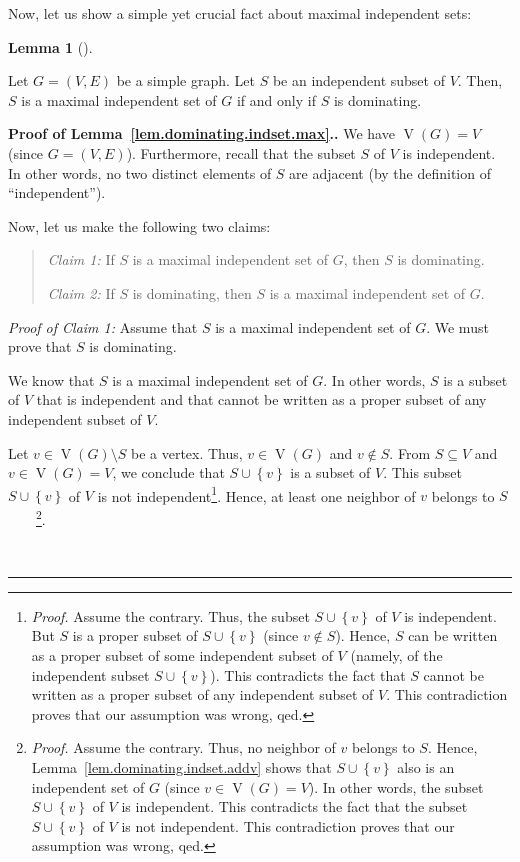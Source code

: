 \documentclass[numbers=enddot,12pt,final,onecolumn,notitlepage]{scrartcl}%
\theoremstyle{definition}
\newtheorem{lem}[theo]{Lemma}
\newenvironment{lemma}[1][]
{\begin{lem}[#1]\begin{leftbar}}
{\end{leftbar}\end{lem}}
\newenvironment{statement}{\begin{quote}}{\end{quote}}
\newenvironment{proof}[1][Proof]{\noindent\textbf{#1.} }{\ \rule{0.5em}{0.5em}}
\newcommand{\set}[1]{\left\{ #1 \right\}}
\newcommand{\tup}[1]{\left( #1 \right)}
\newcommand{\verts}[1]{\operatorname{V}\left( #1 \right)}
\begin{document}
Now, let us show a simple yet crucial fact about maximal independent
sets:

\begin{lemma} \label{lem.dominating.indset.max}
Let $G = \tup{V, E}$ be a simple graph. Let $S$ be an independent
subset of $V$. Then, $S$ is a maximal independent set of $G$ if and
only if $S$ is dominating.
\end{lemma}

\begin{proof}[Proof of Lemma~\ref{lem.dominating.indset.max}.]
We have $\verts{G} = V$ (since $G = \tup{V, E}$). Furthermore, recall
that the subset $S$ of $V$ is independent. In other words, no two
distinct elements of $S$ are adjacent (by the definition of
``independent'').

Now, let us make the following two claims:

\begin{statement}
\textit{Claim 1:} If $S$ is a maximal independent set of $G$, then
$S$ is dominating.

\textit{Claim 2:} If $S$ is dominating, then $S$ is a maximal
independent set of $G$.
\end{statement}

\textit{Proof of Claim 1:} Assume that $S$ is a maximal independent
set of $G$. We must prove that $S$ is dominating.

We know that $S$ is a maximal independent set of $G$. In other words,
$S$ is a subset of $V$ that is independent and that cannot be written
as a proper subset of any independent subset of $V$.

Let $v \in \verts{G} \setminus S$ be a vertex. Thus, $v \in \verts{G}$
and $v \notin S$. From $S \subseteq V$ and $v \in \verts{G} = V$, we
conclude that $S \cup \set{v}$ is a subset of $V$.
This subset $S \cup \set{v}$ of $V$ is not
independent\footnote{\textit{Proof.} Assume the contrary. Thus, the
subset $S \cup \set{v}$ of $V$ is independent. But $S$ is a proper
subset of $S \cup \set{v}$ (since $v \notin S$). Hence, $S$ can be
written as a proper subset of some independent subset of $V$
(namely, of the independent subset $S \cup \set{v}$). This contradicts
the fact that $S$ cannot be written as a proper subset of any
independent subset of $V$. This contradiction proves that our
assumption was wrong, qed.}. Hence, at least one neighbor of $v$
belongs to $S$\ \ \ \ \footnote{\textit{Proof.} Assume the contrary.
Thus, no neighbor of $v$ belongs to $S$. Hence,
Lemma~\ref{lem.dominating.indset.addv} shows that $S \cup \set{v}$
also is an independent set of $G$ (since $v \in \verts{G} = V$). In
other words, the subset $S \cup \set{v}$ of $V$ is independent.
This contradicts the fact that the subset $S \cup \set{v}$ of $V$ is
not independent. This contradiction proves that our assumption was
wrong, qed.}.


\end{proof}
\end{document}
